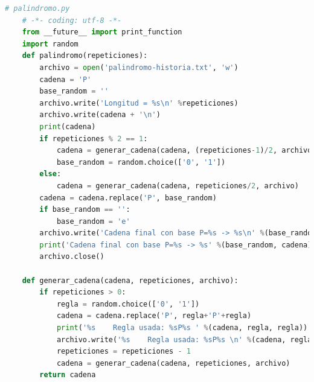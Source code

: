 	\begin{lstlisting}[language=Python]
	# palindromo.py
	# -*- coding: utf-8 -*-
	from __future__ import print_function
	import random
	def palindromo(repeticiones):
	    archivo = open('palindromo-historia.txt', 'w')
	    cadena = 'P'
	    base_random = ''
	    archivo.write('Longitud = %s\n' %repeticiones)
	    archivo.write(cadena + '\n')
	    print(cadena)
	    if repeticiones % 2 == 1:
	        cadena = generar_cadena(cadena, (repeticiones-1)/2, archivo)
	        base_random = random.choice(['0', '1'])
	    else:
	        cadena = generar_cadena(cadena, repeticiones/2, archivo)
	    cadena = cadena.replace('P', base_random)
	    if base_random == '':
	        base_random = 'e'
	    archivo.write('Cadena final con base P=%s -> %s\n' %(base_random, cadena))
	    print('Cadena final con base P=%s -> %s' %(base_random, cadena))
	    archivo.close()

	def generar_cadena(cadena, repeticiones, archivo):
	    if repeticiones > 0:
	        regla = random.choice(['0', '1'])
	        cadena = cadena.replace('P', regla+'P'+regla)
	        print('%s    Regla usada: %sP%s ' %(cadena, regla, regla))
	        archivo.write('%s    Regla usada: %sP%s \n' %(cadena, regla, regla))
	        repeticiones = repeticiones - 1
	        cadena = generar_cadena(cadena, repeticiones, archivo)
	    return cadena
	\end{lstlisting}
	\newpage
